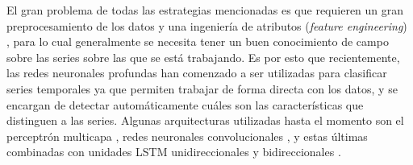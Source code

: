\documentclass[../../main.tex]{subfiles}
\begin{document}
El gran problema de todas las estrategias mencionadas es que requieren un gran
preprocesamiento de los datos y una ingeniería de atributos (\textit{feature engineering})
\cite{wang2016timeseriesclassificationscratch}, para lo cual generalmente se necesita
tener un buen conocimiento de campo sobre las series sobre las que se está trabajando. Es
por esto que recientemente, las redes neuronales profundas han comenzado a ser utilizadas
para clasificar series temporales \cite{wang2016timeseriesclassificationscratch} ya que
permiten trabajar de forma directa con los datos, y se encargan de detectar
automáticamente cuáles son las características que distinguen a las series. Algunas
arquitecturas utilizadas hasta el momento son el perceptrón multicapa
\cite{wang2016timeseriesclassificationscratch}, redes neuronales convolucionales
\cite{wang2016timeseriesclassificationscratch}, y estas últimas combinadas con unidades
LSTM unidireccionales \cite{Karim_2018} y bidireccionales
\cite{khan2021-bilstm-for-unitsc}.
\end{document}
